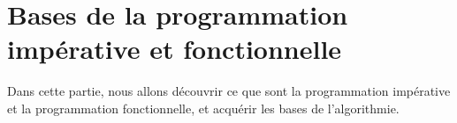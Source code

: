 \part{Bases de la programmation impérative et fonctionnelle}

Dans cette partie, nous allons découvrir ce que sont
la programmation impérative et la programmation fonctionnelle,
et acquérir les bases de l’algorithmie.











